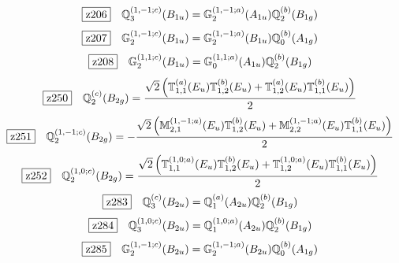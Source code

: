 \documentclass[fleqn,10pt,landscape]{jsarticle}
\begin{document}
\begin{dmath*}
\hspace*{3mm}\fbox{z206}\quad \mathbb{Q}_{3}^{(1,-1;c)}(B_{1u})=\mathbb{G}_{2}^{(1,-1;a)}(A_{1u}) \mathbb{Q}_{2}^{(b)}(B_{1g})
\end{dmath*}
\begin{dmath*}
\hspace*{3mm}\fbox{z207}\quad \mathbb{G}_{2}^{(1,-1;c)}(B_{1u})=\mathbb{G}_{2}^{(1,-1;a)}(B_{1u}) \mathbb{Q}_{0}^{(b)}(A_{1g})
\end{dmath*}
\begin{dmath*}
\hspace*{3mm}\fbox{z208}\quad \mathbb{G}_{2}^{(1,1;c)}(B_{1u})=\mathbb{G}_{0}^{(1,1;a)}(A_{1u}) \mathbb{Q}_{2}^{(b)}(B_{1g})
\end{dmath*}
\begin{dmath*}
\hspace*{3mm}\fbox{z250}\quad \mathbb{Q}_{2}^{(c)}(B_{2g})=\frac{\sqrt{2} \left(\mathbb{T}_{1,1}^{(a)}(E_{u}) \mathbb{T}_{1,2}^{(b)}(E_{u}) + \mathbb{T}_{1,2}^{(a)}(E_{u}) \mathbb{T}_{1,1}^{(b)}(E_{u})\right)}{2}
\end{dmath*}
\begin{dmath*}
\hspace*{3mm}\fbox{z251}\quad \mathbb{Q}_{2}^{(1,-1;c)}(B_{2g})=- \frac{\sqrt{2} \left(\mathbb{M}_{2,1}^{(1,-1;a)}(E_{u}) \mathbb{T}_{1,2}^{(b)}(E_{u}) + \mathbb{M}_{2,2}^{(1,-1;a)}(E_{u}) \mathbb{T}_{1,1}^{(b)}(E_{u})\right)}{2}
\end{dmath*}
\begin{dmath*}
\hspace*{3mm}\fbox{z252}\quad \mathbb{Q}_{2}^{(1,0;c)}(B_{2g})=\frac{\sqrt{2} \left(\mathbb{T}_{1,1}^{(1,0;a)}(E_{u}) \mathbb{T}_{1,2}^{(b)}(E_{u}) + \mathbb{T}_{1,2}^{(1,0;a)}(E_{u}) \mathbb{T}_{1,1}^{(b)}(E_{u})\right)}{2}
\end{dmath*}
\begin{dmath*}
\hspace*{3mm}\fbox{z283}\quad \mathbb{Q}_{3}^{(c)}(B_{2u})=\mathbb{Q}_{1}^{(a)}(A_{2u}) \mathbb{Q}_{2}^{(b)}(B_{1g})
\end{dmath*}
\begin{dmath*}
\hspace*{3mm}\fbox{z284}\quad \mathbb{Q}_{3}^{(1,0;c)}(B_{2u})=\mathbb{Q}_{1}^{(1,0;a)}(A_{2u}) \mathbb{Q}_{2}^{(b)}(B_{1g})
\end{dmath*}
\begin{dmath*}
\hspace*{3mm}\fbox{z285}\quad \mathbb{G}_{2}^{(1,-1;c)}(B_{2u})=\mathbb{G}_{2}^{(1,-1;a)}(B_{2u}) \mathbb{Q}_{0}^{(b)}(A_{1g})
\end{dmath*}
\end{document}
